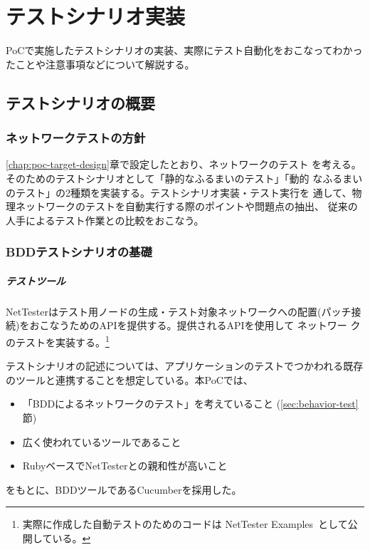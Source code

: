 

\chapter{テストシナリオ実装}
\label{chap:poc-scenario-dev}

PoCで実施したテストシナリオの実装、実際にテスト自動化をおこなってわかっ
たことや注意事項などについて解説する。

 \section{テストシナリオの概要}

  \subsection{ネットワークテストの方針}

\ref{chap:poc-target-design}章で設定したとおり、\yo ネットワークのテスト
を考える。そのためのテストシナリオとして「静的なふるまいのテスト」「動的
なふるまいのテスト」の2種類を実装する。テストシナリオ実装・テスト実行を
通して、物理ネットワークのテストを自動実行する際のポイントや問題点の抽出、
従来の人手によるテスト作業との比較をおこなう。

  \subsection{BDDテストシナリオの基礎}

      \paragraph{テストツール}
NetTesterはテスト用ノードの生成・テスト対象ネットワークへの配置(パッチ接
続)をおこなうためのAPIを提供する。提供されるAPIを使用して \yo ネットワー
クのテストを実装する。\footnote{実際に作成した自動テストのためのコードは
NetTester Examples~\cite{nettester-ex}として公開している。}

テストシナリオの記述については、アプリケーションのテストでつかわれる既存
のツールと連携することを想定している。本PoCでは、
\begin{itemize}
 \item 「BDDによるネットワークのテスト」を考えていること
       (\ref{sec:behavior-test}節)
 \item 広く使われているツールであること
 \item RubyベースでNetTesterとの親和性が高いこと
\end{itemize}
をもとに、BDDツールであるCucumber\cite{cucumber}を採用した。

